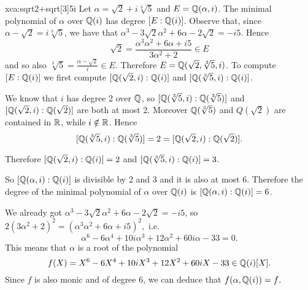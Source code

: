 \begin{sol}{xca:sqrt{2}+sqrt[3]{5}i}
    Let $\alpha=\sqrt{2}+i\sqrt[3]{5}$ and $E=\mathbb{Q}(\alpha,i)$. 
    The minimal polynomial of $\alpha$ over $\mathbb{Q}(i)$ has
    degree $[E:\mathbb{Q}(i)]$.
    Observe that, since $\alpha-\sqrt{2}=i\sqrt[3]{5}$,
    we have that $\alpha^3-3\sqrt{2}\alpha^2+6\alpha-2\sqrt{2}=-i5$.
    Hence 
    \[
    \sqrt{2}=\frac{\alpha^3\alpha^2+6\alpha+i5}{3\alpha^2+2}\in E
    \]
    and so also $\sqrt[3]{5}=\frac{\alpha-\sqrt{2}}{i}\in E$. 
    Therefore $E=\mathbb{Q}(\sqrt{2},\sqrt[3]{5},i)$.
    To compute $[E:\mathbb{Q}(i)]$ we first compute $[\mathbb{Q}(\sqrt{2},i):\mathbb{Q}(i)]$
    and  $[\mathbb{Q}(\sqrt[3]{5},i):\mathbb{Q}(i)]$.
    
    We know that $i$ has degree 2 over $\mathbb{Q}$,
so $[\mathbb{Q}(\sqrt[3]{5},i):\mathbb{Q}(\sqrt[3]{5})]$ and 
$[\mathbb{Q}(\sqrt{2},i):\mathbb{Q}(\sqrt{2})]$ are both at most 2.
Moreover $\mathbb{Q}(\sqrt[3]{5})$ and $Q(\sqrt{2})$ are contained in $\mathbb{R}$,
while $i\notin\mathbb{R}$.
Hence
\[
[\mathbb{Q}(\sqrt[3]{5},i):\mathbb{Q}(\sqrt[3]{5})]=2=[\mathbb{Q}(\sqrt{2},i):\mathbb{Q}(\sqrt{2})].
\]
\begin{center}
    \end{center}
Therefore $[\mathbb{Q}(\sqrt{2},i):\mathbb{Q}(i)]=2$
    and  $[\mathbb{Q}(\sqrt[3]{5},i):\mathbb{Q}(i)]=3$.
    \begin{center}
    \end{center}
So $[\mathbb{Q}(\alpha, i):\mathbb{Q}(i)]$ is divisible by 2 and 3 and it is also at most 6.
Therefore the degree of the minimal polynomial
of $\alpha$ over $\mathbb{Q}(i)$ is $[\mathbb{Q}(\alpha,i):\mathbb{Q}(i)]=6$.

We already got $\alpha^3-3\sqrt{2}\alpha^2+6\alpha-2\sqrt{2}=-i5$, 
so $2(3\alpha^2+2)^2=(\alpha^3\alpha^2+6\alpha+i5)^2,
$
i.e. 
\[
\alpha^6-6\alpha^4+10i\alpha^3+12\alpha^2+60i\alpha-33=0.
\]
This means that $\alpha$ is a root of the polynomial
\[
f(X)=X^6-6X^4+10iX^3+12X^2+60iX-33\in\mathbb{Q}(i)[X].
\]
Since $f$ is also monic and of degree 6, we can deduce that 
$f(\alpha,\mathbb{Q}(i))=f$.
\end{sol}

